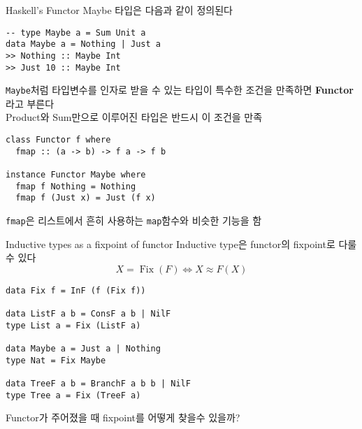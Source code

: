 \documentclass[t]{beamer}
\begin{document}
\begin{frame}[fragile]{Haskell's Functor}
  Maybe 타입은 다음과 같이 정의된다
\begin{verbatim}
-- type Maybe a = Sum Unit a
data Maybe a = Nothing | Just a
>> Nothing :: Maybe Int
>> Just 10 :: Maybe Int
\end{verbatim}
  \pause
  \texttt{Maybe}처럼 타입변수를 인자로 받을 수 있는 타입이 특수한 조건을 만족하면 \textbf{Functor}라고 부른다\\
  Product와 Sum만으로 이루어진 타입은 반드시 이 조건을 만족
\begin{verbatim}
class Functor f where
  fmap :: (a -> b) -> f a -> f b

instance Functor Maybe where
  fmap f Nothing = Nothing
  fmap f (Just x) = Just (f x)
\end{verbatim}
  \texttt{fmap}은 리스트에서 흔히 사용하는 \texttt{map}함수와 비슷한 기능을 함

\end{frame}

\begin{frame}[fragile]{Inductive types as a fixpoint of functor}
  Inductive type은 functor의 fixpoint로 다룰 수 있다\\
  \pause
  \[ X = \operatorname{Fix}(F) \Leftrightarrow X \approx F(X) \]
  \pause
\begin{verbatim}
data Fix f = InF (f (Fix f))

data ListF a b = ConsF a b | NilF
type List a = Fix (ListF a)

data Maybe a = Just a | Nothing
type Nat = Fix Maybe

data TreeF a b = BranchF a b b | NilF
type Tree a = Fix (TreeF a)
\end{verbatim}
  \pause
  Functor가 주어졌을 때 fixpoint를 어떻게 찾을수 있을까?
\end{frame}
\end{document}
